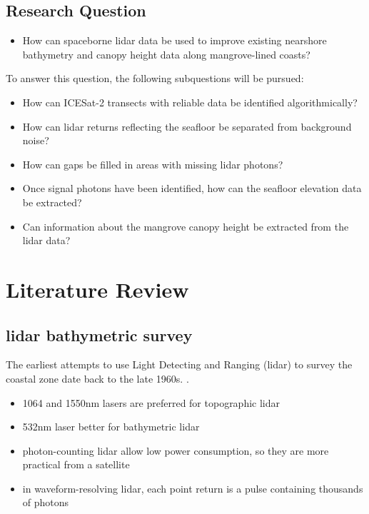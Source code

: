 \hypertarget{research-question}{%
  \section{Research Question}\label{research-question}}


\begin{itemize}
  \item
        How can spaceborne lidar data be used to improve existing nearshore
        bathymetry and canopy height data along mangrove-lined coasts?
\end{itemize}

To answer this question, the following subquestions will be pursued:

\begin{itemize}
  \item
        How can ICESat-2 transects with reliable data be identified
        algorithmically?
  \item
        How can lidar returns reflecting the seafloor be separated from
        background noise?
  \item
        How can gaps be filled in areas with missing lidar photons?
  \item
        Once signal photons have been identified, how can the seafloor
        elevation data be extracted?
  \item
        Can information about the mangrove canopy height be extracted from the
        lidar data?
\end{itemize}

\hypertarget{literature-review}{%
  \chapter{Literature Review}\label{literature-review}}

\hypertarget{lidar-bathymetric-survey}{%
  \section{lidar bathymetric survey}\label{lidar-bathymetric-survey}}

The earliest attempts to use Light Detecting and Ranging (lidar) to survey the coastal zone date back to the late 1960s. \cite{Bailly2016}.

\begin{itemize}
  \item
        1064 and 1550nm lasers are preferred for topographic lidar
  \item
        532nm laser better for bathymetric lidar
  \item
        photon-counting lidar allow low power consumption, so they are more
        practical from a satellite
  \item
        in waveform-resolving lidar, each point return is a pulse containing
        thousands of photons
\end{itemize}

